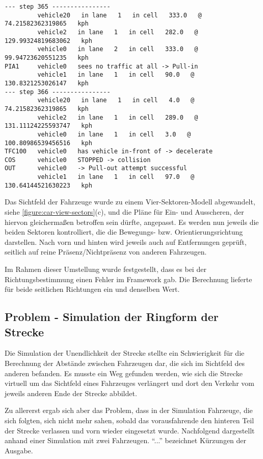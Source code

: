\footnotesize\begin{verbatim}
--- step 365 ----------------
         vehicle20   in lane   1   in cell   333.0   @   74.21582362319865   kph
         vehicle2   in lane   1   in cell   282.0   @   129.99324819683062   kph
         vehicle0   in lane   2   in cell   333.0   @   99.94723620551235   kph
PIA1     vehicle0   sees no traffic at all -> Pull-in
         vehicle1   in lane   1   in cell   90.0   @   130.8321253026147   kph
--- step 366 ----------------
         vehicle20   in lane   1   in cell   4.0   @   74.21582362319865   kph
         vehicle2   in lane   1   in cell   289.0   @   131.11124225593747   kph
         vehicle0   in lane   1   in cell   3.0   @   100.80986539456516   kph
TFC100   vehicle0   has vehicle in-front of -> decelerate
COS      vehicle0   STOPPED -> collision
OUT      vehicle0   -> Pull-out attempt successful
         vehicle1   in lane   1   in cell   97.0   @   130.64144521630223   kph
\end{verbatim}
\normalsize

Das Sichtfeld der Fahrzeuge wurde zu einem Vier-Sektoren-Modell abgewandelt, siehe \cref{figure:car-view-sectors}(c), und die Pläne für Ein- und Ausscheren, der hiervon gleichermaßen betroffen sein dürfte, angepasst.
Es werden nun jeweils die beiden Sektoren kontrolliert, die die Bewegungs- bzw. Orientierungsrichtung darstellen. 
Nach vorn und hinten wird jeweils auch auf Entfernungen geprüft, seitlich auf reine Präsenz/Nichtpräsenz von anderen Fahrzeugen.

Im Rahmen dieser Umstellung wurde festgestellt, dass es bei der Richtungsbestimmung einen Fehler im Framework gab.
Die Berechnung lieferte für beide seitlichen Richtungen ein und denselben Wert.



\subsection{Problem - Simulation der Ringform der Strecke}

Die Simulation der Unendlichkeit der Strecke stellte ein Schwierigkeit für die Berechnung der Abstände zwischen Fahrzeugen dar, die sich im Sichtfeld des anderen befanden.
Es musste ein Weg gefunden werden, wie sich die Strecke virtuell um das Sichtfeld eines Fahrzeuges verlängert und dort den Verkehr vom jeweils anderen Ende der Strecke abbildet.

Zu allererst ergab sich aber das Problem, dass in der Simulation Fahrzeuge, die sich folgten, sich nicht mehr sahen, sobald das vorausfahrende den hinteren Teil der Strecke verlassen und vorn wieder eingesetzt wurde.
Nachfolgend dargestellt anhand einer Simulation mit zwei Fahrzeugen.
\enquote{...} bezeichnet Kürzungen der Ausgabe.

